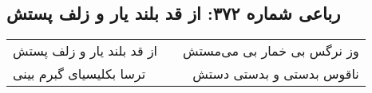 \begin{center}
\section*{رباعی شماره ۳۷۲: از قد بلند یار و زلف پستش}
\label{sec:sh372}
\begin{longtable}{l p{0.5cm} r}
از قد بلند یار و زلف پستش
&&
وز نرگس بی خمار بی می‌مستش
\\
ترسا بکلیسیای گبرم بینی
&&
ناقوس بدستی و بدستی دستش
\\
\end{longtable}
\end{center}
